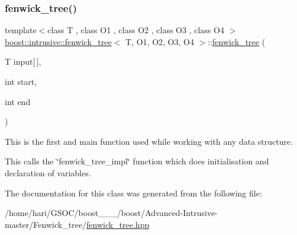 \subsubsection{\texorpdfstring{fenwick\+\_\+tree()}{fenwick\_tree()}}
{\footnotesize\ttfamily template$<$class T , class O1 , class O2 , class O3 , class O4 $>$ \\
\hyperlink{classboost_1_1intrusive_1_1fenwick__tree}{boost\+::intrusive\+::fenwick\+\_\+tree}$<$ T, O1, O2, O3, O4 $>$\+::\hyperlink{classboost_1_1intrusive_1_1fenwick__tree}{fenwick\+\_\+tree} (\begin{DoxyParamCaption}\item[{T}]{input\mbox{[}$\,$\mbox{]},  }\item[{int}]{start,  }\item[{int}]{end }\end{DoxyParamCaption})\hspace{0.3cm}{\ttfamily [inline]}}


\begin{DoxyItemize}
\item This is the first and main function used while working with any data structure. 
\item This calls the \char`\"{}fenwick\+\_\+tree\+\_\+impl\char`\"{} function which does initialisation and declaration of variables. 
\end{DoxyItemize}

The documentation for this class was generated from the following file\+:\begin{DoxyCompactItemize}
\item 
/home/hari/\+G\+S\+O\+C/boost\+\_\+\_\+\_/boost/\+Advanced-\/\+Intrusive-\/master/\+Fenwick\+\_\+tree/\hyperlink{fenwick__tree_8hpp}{fenwick\+\_\+tree.\+hpp}\end{DoxyCompactItemize}
